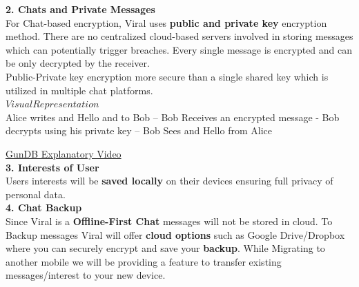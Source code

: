 \documentclass[10pt]{article}
\begin{document}

\textbf{2. Chats and Private Messages}\\

For Chat-based encryption, Viral uses \textbf{public and private key} encryption method. There are no centralized cloud-based servers involved in storing messages which can potentially trigger breaches. Every single message is encrypted and can be only decrypted by the receiver.\\

Public-Private key encryption more secure than a single shared key which is utilized in multiple chat platforms.\\

$Visual Representation$\\

Alice writes and Hello and to Bob – Bob Receives an encrypted message - Bob decrypts using his private key – Bob Sees and Hello from Alice

\hyperlink{https://sample.com}{GunDB Explanatory Video}\\

\textbf{3. Interests of User}\\

Users\textsc{} interests will be \textbf{saved locally} on their devices ensuring full privacy of personal data.\\

\textbf{4. Chat Backup}\\

Since Viral is a \textbf{Offline-First Chat} messages will not be stored in cloud. To Backup messages Viral will offer \textbf{cloud options} such as Google Drive/Dropbox where you can securely encrypt and save your \textbf{backup}. While Migrating to another mobile we will be providing a feature to transfer existing messages/interest to your new device.\\
\end{document}
